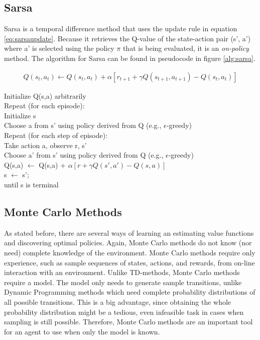 \documentclass{article}
\newcommand{\tab}{\hspace{10mm}}
\newcommand{\dtab}{\hspace{20mm}}
\begin{document}
\subsection{Sarsa}
Sarsa is a temporal difference method that uses the update rule in equation \ref{eq:sarsaupdate}. Because it retrieves the Q-value of the state-action pair (s', a') where a' is selected using the policy $\pi$ that is being evaluated, it is an \textit{on-policy} method. The algorithm for Sarsa can be found in pseudocode in figure \ref{alg:sarsa}.
\begin{mdframed}
\begin{align}
Q(s_t, a_t) \leftarrow Q(s_t,a_t) + \alpha \left[ r_{t+1} + \gamma Q(s_{t+1},a_{t+1}) - Q(s_t,a_t)\right]\label{eq:sarsaupdate}
\end{align}
\end{mdframed}


\begin{center}
\begin{mdframed}
\begin{algorithm}[H]
Initialize Q(s,a) arbitrarily\\
Repeat (for each episode):\\
\tab Initialize s \\
\tab Choose a from s' using policy derived from Q (e.g., $\epsilon$-greedy)\\
\tab Repeat (for each step of episode):\\
\dtab Take action a, observe r, s'\\
\dtab Choose a' from s' using policy derived from Q (e.g., $\epsilon$-greedy)\\
\dtab Q(s,a) $\leftarrow$ Q(s,a) + $\alpha [ r + \gamma Q(s', a') - Q(s, a) ]$ \\
\dtab s $\leftarrow$ s'; \\
\tab until s is terminal\\
\end{algorithm}
\end{mdframed}
\label{alg:sarsa}
\end{center}



\subsection{Monte Carlo Methods}
As stated before, there are several ways of learning an estimating value functions and discovering optimal policies. Again, Monte Carlo methods do not know (nor need) complete knowledge of the environment. Monte Carlo methods require only experience, such as sample sequences of states, actions, and rewards, from on-line interaction with an environment. Unlike TD-methods, Monte Carlo methods require a model. The model only needs to generate sample transitions, unlike Dynamic Programming methods which need complete probability distributions of all possible transitions. This is a big advantage, since obtaining the whole probability distribution might be a tedious, even infeasible task in cases when sampling is still possible. Therefore, Monte Carlo methods are an important tool for an agent to use when only the model is known.
\end{document}
